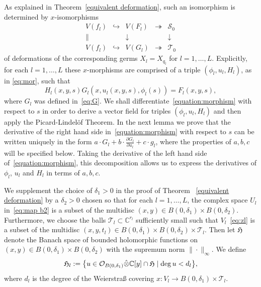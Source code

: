 \documentclass[11pt,twoside]{amsart}
\theoremstyle{plain}
\newcommand{\Sm}{\mathcal{S}}
\newcommand{\Tm}{\mathcal{T}}
\newcommand{\Sh}[1]{\mathcal{#1}} %
\begin{document}
As explained in Theorem~\ref{equivalent deformation}, such an isomorphism is determined by $x$-isomorphisms
$$\begin{array}{ccccl}
V(f_l)&\hookrightarrow& V(F_l)&\twoheadrightarrow&\Sm_0\\
\| &&\downarrow&&\downarrow\\
V(f_l)&\hookrightarrow&V(G_l)&\twoheadrightarrow&\Tm_0
\end{array}$$
of deformations of the corresponding germs $ X_l = X_{q_l} $ for $l=1,\ldots, L$. Explicitly, for each $l=1,\ldots, L$ these $x$-morphisms are comprised  of a triple $(\phi_l,u_l,H_l)$, as in \eqref{eq:mor}, such that
\begin {equation}\label {equation:morphism}
H_l (x,y,s)G_l (x,u_l (x,y,s),\phi_l(s))=F_l (x,y,s),
\end {equation}
where $ G_l $ was defined in~\eqref {eq:G}. 
We shall differentiate~\eqref{equation:morphism} with respect to $s$ in order to derive a vector field for triples $(\phi_l,u_l,H_l)$ and then apply the Picard-Lindel\"of Theorem. 
In the next lemma we prove that the derivative of the right hand side in~\eqref{equation:morphism} with respect to $s$ can be written uniquely in the form $a\cdot G_l + b \cdot \frac {\partial G_l} {\partial u_l} + c\cdot g_l$, where the properties of $a,b,c$ will be specified below. Taking the derivative of the left hand side of~\eqref{equation:morphism}, this decomposition allows us to express the derivatives of $\phi_l$, $u_l$ and $H_l$ in terms of $a,b,c$.


We supplement the choice of $\delta_1>0$ in the proof of Theorem ~\ref{equivalent deformation} by a $\delta_2>0$ chosen so that for each $l=1,\ldots,L$, the complex space $U_l$ in~\eqref{eq:map b2} is a subset of the multidisc $(x,y)\in B(0,\delta_1)\times B(0,\delta_2)$. Furthermore, we choose the balls $\Tm_l\subset\mathbb{C}^{r_l}$ sufficiently small such that $V_l$~\eqref{eq:zl} is a subset of the multidisc $(x,y,t_l)\in B(0,\delta_1)\times B(0,\delta_2)\times\Tm_l$. Then %
let $\mathfrak {H}$ denote the Banach space of bounded holomorphic functions on $(x,y)\in B(0,\delta_1)\times B(0,\delta_2)$ with the supremum norm $\|\cdot\|_\infty$. We define
$$\mathfrak {H}_l:=\big\{u\in\Sh{O}_{B(0,\delta_1)}\Hat{\otimes}\mathbb{C}[y]\cap\mathfrak{H}\mid\deg u<d_l\big\},$$ %
where $d_l$ is the degree of the Weierstra{\ss} covering
$ x: V_l \to B (0,\delta_1)\times\mathcal T_l$.
\end{document}
